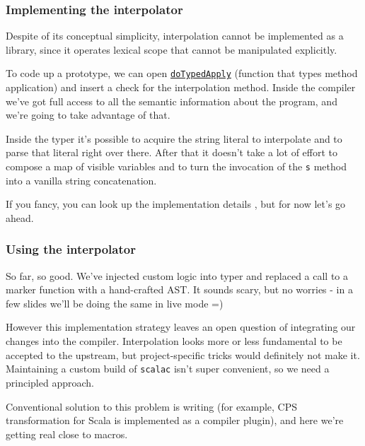\documentclass[hyperref={bookmarks=false}]{beamer}
\begin{document}
\begin{frame}[t,fragile]
\frametitle{Implementing the interpolator}

Despite of its conceptual simplicity, interpolation cannot be implemented as a library, since it operates lexical scope that cannot be manipulated explicitly.

To code up a prototype, we can open \texttt{\color{linkblue}\href{https://github.com/xeno-by/alphakeplerdemo/blob/sources/src/compiler/scala/tools/nsc/typechecker/Typers.scala\#L2263}{doTypedApply}} (function that types method application) and insert a check for the interpolation method. Inside the compiler we've got full access to all the semantic information about the program, and we're going to take advantage of that.

Inside the typer it's possible to acquire the string literal to interpolate and to parse that literal right over there. After that it doesn't take a lot of effort to compose a map of visible variables and to turn the invocation of the \texttt{s} method into a vanilla string concatenation.

If you fancy, you can look up the implementation details , but for now let's go ahead.
\end{frame}

\begin{frame}[t,fragile]
\frametitle{Using the interpolator}

So far, so good. We've injected custom logic into typer and replaced a call to a marker function with a hand-crafted AST. It sounds scary, but no worries - in a few slides we'll be doing the same in live mode =)

However this implementation strategy leaves an open question of integrating our changes into the compiler. Interpolation looks more or less fundamental to be accepted to the upstream, but project-specific tricks would definitely not make it. Maintaining a custom build of \texttt{scalac} isn't super convenient, so we need a principled approach.

Conventional solution to this problem is writing  (for example, CPS transformation for Scala is implemented as a compiler plugin), and here we're getting real close to macros.
\end{frame}
\end{document}
